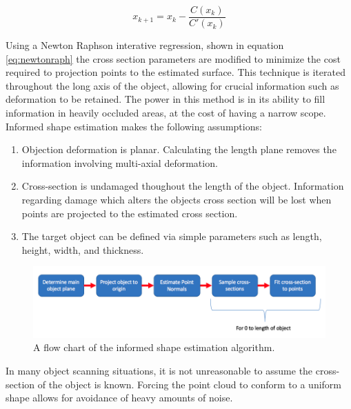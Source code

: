 \documentclass[12pt]{drexelthesis}
\begin{document}
\begin{equation}
	\label{eq:newtonraph}
	x_{k+1} = x_{k} - \frac{C(x_{k})}{C'(x_{k})}
\end{equation}

Using a Newton Raphson interative regression, shown in equation \ref{eq:newtonraph} the cross section parameters are modified to minimize the cost required to projection points to the estimated surface. This technique is iterated throughout the long axis of the object, allowing for crucial information such as deformation to be retained. The power in this method is in its ability to fill information in heavily occluded areas, at the cost of having a narrow scope. Informed shape estimation makes the following assumptions:

\begin{enumerate}
	\item Objection deformation is planar. Calculating the length plane removes the information involving multi-axial deformation.
	\item Cross-section is undamaged thoughout the length of the object. Information regarding damage which alters the objects cross section will be lost when points are projected to the estimated cross section.
	\item The target object can be defined via simple parameters such as length, height, width, and thickness.
\end{enumerate}

\begin{figure}[!ht]
	\centering
		\includegraphics[width=5in]{cross-section-estimation/flowchart.png}
	\caption[Flow chart of informed shape estimation algorithm]{\centering A flow chart of the informed shape estimation algorithm.}
\end{figure}

In many object scanning situations, it is not unreasonable to assume the cross-section of the object is known. Forcing the point cloud to conform to a uniform shape allows for avoidance of heavy amounts of noise.
\end{document}
